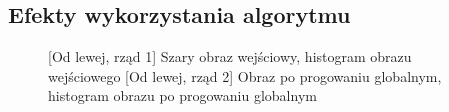 \documentclass[a4paper,12pt, titlepage]{report}
\begin{document}
\subsection*{Efekty wykorzystania algorytmu}
\begin{figure}[h]
    \centering
    \qquad
    \caption{[Od lewej, rząd 1] Szary obraz wejściowy, histogram obrazu wejściowego [Od lewej, rząd 2] Obraz po progowaniu globalnym, histogram obrazu po progowaniu globalnym}%
    \label{fig:rysunek}%
\end{figure}
\end{document}
